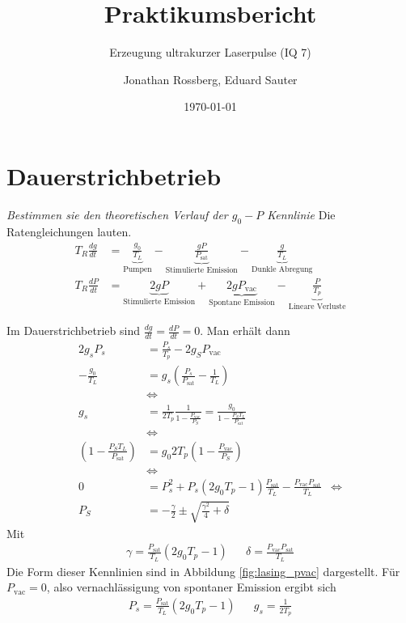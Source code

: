 \documentclass[11pt,twoside=true]{scrartcl}
\title{Praktikumsbericht}
\subtitle{Erzeugung ultrakurzer Laserpulse (IQ 7)}
\author{Jonathan Rossberg,
      Eduard Sauter}
\date{\today}
\newcommand{\dd}[2]{\frac{d{#1}}{d{#2}}}
\begin{document}
\maketitle
\newpage
\section{Dauerstrichbetrieb}
\textsl{Bestimmen sie den theoretischen Verlauf der $g_0-P$ Kennlinie} 
%
Die Ratengleichungen lauten.
\begin{align*}
  T_R \dd{g}{t} & 
    = \underbrace{\frac{g_0}{T_L}}_{\text{Pumpen}}   
    - \underbrace{\frac{g P}{ P_{\text{sat}}}}_{\text{Stimulierte Emission}}  
    - \underbrace{\frac{g}{T_L}}_{\text{Dunkle Abregung}} \\
  T_R \dd{P}{t} & 
    = \underbrace{2 g P}_{\text{Stimulierte Emission}}  
    + \underbrace{2 g P_\text{vac}}_{\text{Spontane Emission}}  
    - \underbrace{\frac{P}{T_p}}_{\text{Lineare Verluste}}
\end{align*}


Im Dauerstrichbetrieb sind $\dd{g}{t} = \dd{P}{t} = 0$. 
Man erhält dann
%
\begin{align*}
  2 g_s P_s  & = \frac{P_s}{T_p} - 2 g_S P_\text{vac} \\
  - \frac{g_0}{T_L}  & = g_s\left( \frac{P_s}{P_\text{sat}} - \frac{1}{T_L} \right) \\
  & \iff  \\
  g_s & = \frac{1}{2 T_p} \frac{1}{1- \frac{P_\text{vac}}{P_S}} = \frac{g_0}{1 - \frac{P_S T_L}{P_\text{sat}}} \\
  & \iff   \\
  \left( 1 - \frac{P_S T_L}{P_\text{sat}} \right)  & = g_0 2 T_p \left( 1 - \frac{P_\text{vac}}{P_S} \right) \\
  & \iff  \\
  0 & = P_s^2 + P_s (2 g_0 T_p - 1) \frac{P_\text{sat}}{T_L} - \frac{P_\text{vac}P_\text{sat}}{T_L}
  & \iff \\
  P_S & = - \frac{\gamma}{2} \pm \sqrt{\frac{\gamma^2}{4} + \delta}
\end{align*}
Mit 
%
\begin{align*}
  \gamma = \frac{P_\text{sat}}{T_L} (2 g_0 T_p - 1) && \delta = \frac{P_\text{vac} P_\text{sat}}{T_L}
\end{align*}
%
Die Form dieser Kennlinien sind in Abbildung \ref{fig:lasing_pvac} dargestellt.
%
Für $P_\text{vac} = 0 $, also vernachlässigung von spontaner Emission ergibt sich
%
\begin{align*}
  P_s = \frac{P_\text{sat}}{T_L} (2 g_0 T_p - 1) && g_s = \frac{1}{2 T_p}
\end{align*}
%
\end{document}

